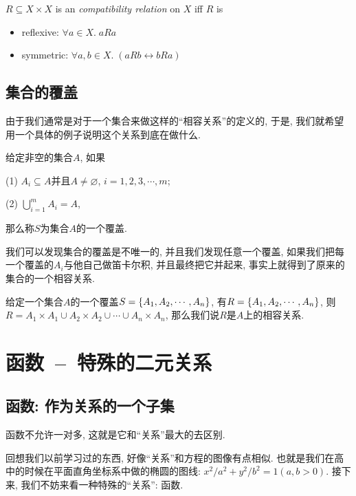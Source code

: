 \begin{definition}
  $R \subseteq X \times X$ is an {\it compatibility relation} on $X$ iff $R$ is
  \begin{itemize}
    \item reflexive: $\forall a \in X.\; a R a$
    \item symmetric: $\forall a, b \in X.\; (a R b \leftrightarrow b R a)$
  \end{itemize}
\end{definition}

\subsection{集合的覆盖}

由于我们通常是对于一个集合来做这样的``相容关系''的定义的, 于是, 我们就希望用一个具体的例子说明这个关系到底在做什么.

\begin{definition}
	给定非空的集合$A$, 如果
	
	(1) $A_i \subseteq A$并且$A\neq \varnothing$, $i=1,2,3,\cdots,m $;
	
	(2) $\bigcup_{i=1}^m A_i = A$, 
	
	那么称$S$为集合$A$的一个覆盖. 
\end{definition} 

我们可以发现集合的覆盖是不唯一的, 并且我们发现任意一个覆盖, 如果我们把每一个覆盖的$A_i$与他自己做笛卡尔积, 并且最终把它并起来, 事实上就得到了原来的集合的一个相容关系. 

\begin{theorem}
	给定一个集合$A$的一个覆盖$S=\{A_1 ,A_2 ,\cdots, A_n \}$, 有$R=\{A_1, A_2, \cdots , A_n\}$, 则$R=A_1\times A_1 \cup A_2 \times A_2\cup \cdots \cup A_n \times A_n$, 那么我们说$R$是$A$上的相容关系. 
\end{theorem}

\section{函数~--~特殊的二元关系}

\subsection{函数: 作为关系的一个子集}

函数不允许一对多, 这就是它和``关系''最大的去区别. 

回想我们以前学习过的东西, 好像``关系''和方程的图像有点相似. 也就是我们在高中的时候在平面直角坐标系中做的椭圆的图线: $x^2/a^2+y^2/b^2=1(a, b>0)$. 接下来, 我们不妨来看一种特殊的``关系'': 函数. 

